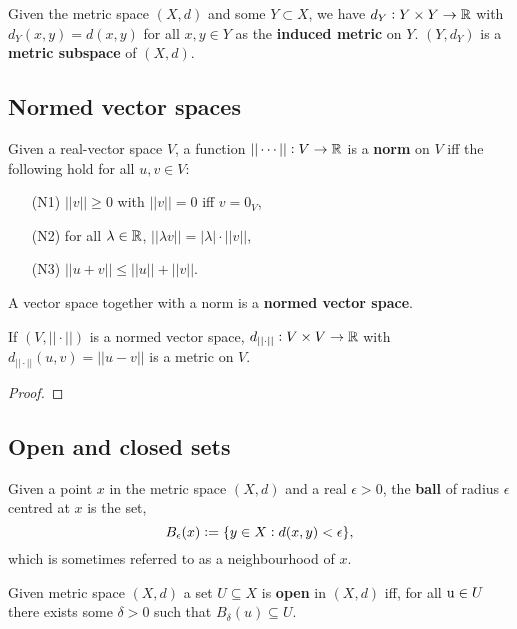 \documentclass[../Year2.tex]{subfiles}
\begin{document}
\begin{definition}
    Given the metric space $(X,d)$ and some $Y\subset X$, we have $d_Y:Y\times Y\rightarrow\mathbb{R}$ with $d_Y(x,y)=d(x,y)$ for all $x,y\in Y$ as the \textbf{induced metric} on $Y$. $(Y,d_Y)$ is a \textbf{metric subspace} of $(X,d)$.
\end{definition}

\subsection{Normed vector spaces}

\begin{definition}
    Given a real-vector space $V$, a function $||\cdots||:V\rightarrow\mathbb{R}$ is a \textbf{norm} on $V$ iff the following hold for all $u,v\in V$:\begin{enumerate}
        \item[(N1)] $||v||\geq 0$ with $||v||=0$ iff $v=0_V$,
        \item[(N2)] for all $\lambda\in\mathbb{R}$, $||\lambda v|| = |\lambda|\cdot||v||$,
        \item[(N3)] $||u+v||\leq||u||+||v||$.
    \end{enumerate} A vector space together with a norm is a \textbf{normed vector space}.
\end{definition}

\begin{lemma}
    If $(V,||\cdot||)$ is a normed vector space, $d_{||\cdot||}:V\times V\rightarrow\mathbb{R}$ with $d_{||\cdot||}(u,v) = ||u-v||$ is a metric on $V$.
    \begin{proof}
        
    \end{proof}
\end{lemma}

\subsection{Open and closed sets}

\begin{definition}
    Given a point $x$ in the metric space $(X,d)$ and a real $\epsilon>0$, the \textbf{ball} of radius $\epsilon$ centred at $x$ is the set, \[
        B_\epsilon(x) := \{y\in X: d(x,y)<\epsilon\}\text{\textcolor{black}{,}}
    \] which is sometimes referred to as a neighbourhood of $x$.
\end{definition}

\begin{definition}
    Given metric space $(X,d)$ a set $U\subseteq X$ is \textbf{open} in $(X,d)$ iff, for all $\mathrm{u}\in U$ there exists some $\delta>0$ such that $B_\delta(u)\subseteq U$.
\end{definition}
\end{document}
